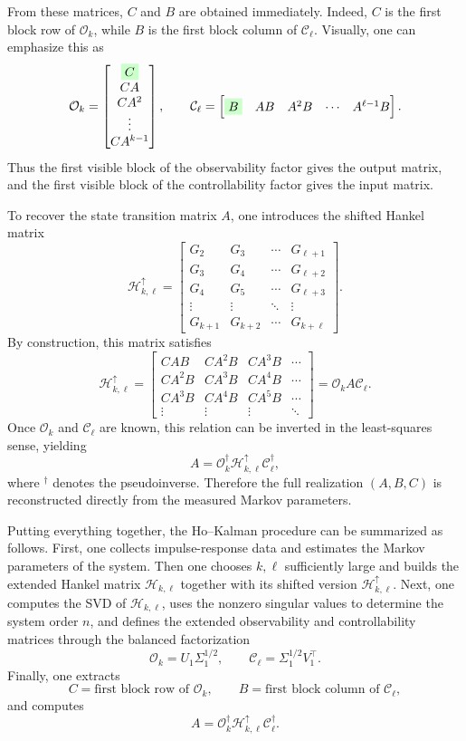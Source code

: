 From these matrices, \(C\) and \(B\) are obtained immediately. Indeed, \(C\) is the first block row of \(\mathcal{O}_k\), while \(B\) is the first block column of \(\mathcal{C}_\ell\). Visually, one can emphasize this as
\[
\mathcal{O}_k=
\begin{bmatrix}
\colorbox{green!20}{$C$}\\
CA\\
CA^2\\
\vdots\\
CA^{k-1}
\end{bmatrix},
\qquad
\mathcal{C}_\ell=
\begin{bmatrix}
\colorbox{green!20}{$B$} & AB & A^2B & \cdots & A^{\ell-1}B
\end{bmatrix}.
\]
Thus the first visible block of the observability factor gives the output matrix, and the first visible block of the controllability factor gives the input matrix.

To recover the state transition matrix \(A\), one introduces the shifted Hankel matrix
\[
\mathcal{H}^{\uparrow}_{k,\ell}=
\begin{bmatrix}
G_2 & G_3 & \cdots & G_{\ell+1}\\
G_3 & G_4 & \cdots & G_{\ell+2}\\
G_4 & G_5 & \cdots & G_{\ell+3}\\
\vdots & \vdots & \ddots & \vdots\\
G_{k+1} & G_{k+2} & \cdots & G_{k+\ell}
\end{bmatrix}.
\]
By construction, this matrix satisfies
\[
\mathcal{H}^{\uparrow}_{k,\ell}=
\begin{bmatrix}
CAB & CA^2B & CA^3B & \cdots\\
CA^2B & CA^3B & CA^4B & \cdots\\
CA^3B & CA^4B & CA^5B & \cdots\\
\vdots & \vdots & \vdots & \ddots
\end{bmatrix}
=
\mathcal{O}_k A \mathcal{C}_\ell.
\]
Once \(\mathcal{O}_k\) and \(\mathcal{C}_\ell\) are known, this relation can be inverted in the least-squares sense, yielding
\[
A = \mathcal{O}_k^\dagger \mathcal{H}^{\uparrow}_{k,\ell}\mathcal{C}_\ell^\dagger,
\]
where \({}^\dagger\) denotes the pseudoinverse. Therefore the full realization \((A,B,C)\) is reconstructed directly from the measured Markov parameters.

Putting everything together, the Ho--Kalman procedure can be summarized as follows. First, one collects impulse-response data and estimates the Markov parameters of the system. Then one chooses \(k,\ell\) sufficiently large and builds the extended Hankel matrix \(\mathcal{H}_{k,\ell}\) together with its shifted version \(\mathcal{H}^{\uparrow}_{k,\ell}\). Next, one computes the SVD of \(\mathcal{H}_{k,\ell}\), uses the nonzero singular values to determine the system order \(n\), and defines the extended observability and controllability matrices through the balanced factorization
\[
\mathcal{O}_k = U_1\Sigma_1^{1/2},
\qquad
\mathcal{C}_\ell = \Sigma_1^{1/2}V_1^\top.
\]
Finally, one extracts
\[
C=\text{first block row of }\mathcal{O}_k,\qquad
B=\text{first block column of }\mathcal{C}_\ell,
\]
and computes
\[
A = \mathcal{O}_k^\dagger \mathcal{H}^{\uparrow}_{k,\ell}\mathcal{C}_\ell^\dagger.
\]

